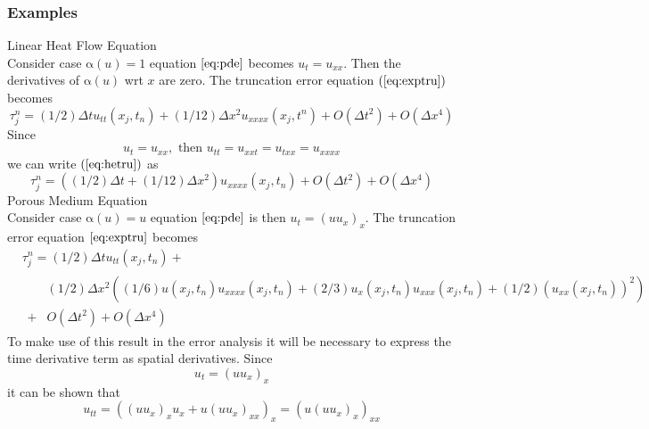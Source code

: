 \documentclass[11pt]{article}
\newcommand{\D}{\Delta}
\newcommand{\al}{\mathrm{\alpha}}
\begin{document}
\subsubsection{Examples}
Linear Heat Flow Equation\\
Consider case $\al(u)=1$ equation $\ref{eq:pde}$ becomes $u_t=u_{xx}$. Then the derivatives of $\al(u)$ wrt $x$ are zero. The truncation error equation $(\ref{eq:exptru})$ becomes
\begin{equation}
\label{eq:hetru}
\tau_j^n = (1/2)\D{t}u_{tt}(x_j,t_n) + (1/12) \D{x^2}u_{xxxx}(x_j,t^n) +O(\D{t^2})+ O(\D{x^4}) 
\end{equation}
Since $$u_t = u_{xx}, \text{ then }u_{tt} = u_{xxt} = u_{txx} = u_{xxxx}$$ 
we can write $(\ref{eq:hetru})$ as
\begin{equation}
\label{eq:hetru1}
\tau_j^n =\left ((1/2)\D{t} + (1/12) \D{x^2}\right)u_{xxxx}(x_j,t_n) +O(\D{t^2})+ O(\D{x^4}) 
\end{equation}
Porous Medium Equation\\
Consider case $\al(u)=u$ equation $\ref{eq:pde}$ is then $u_t=({uu_x})_x$. The truncation error equation $\ref{eq:exptru}$ becomes
\begin{equation}
\label{eq:pmetru}
\begin{split}
&\tau_j^n = (1/2)\D{t}u_{tt}(x_j,t_n) + \\
&\begin{aligned}
&(1/2) \D{x^2}\left(  (1/6)u(x_j,t_n)u_{xxxx}(x_j,t_n) + (2/3)u_x(x_j,t_n)u_{xxx}(x_j,t_n) + (1/2) (u_{xx}(x_j,t_n))^2  \right) \\
+&O(\D{t^2})+ O(\D{x^4})
\end{aligned}
\end{split}
\end{equation}
To make use of this result in the error analysis it will be necessary to express the time derivative term as spatial derivatives. 
Since $$u_t= (uu_x)_x$$ it can be shown that
$$u_{tt} = \left( (uu_x)_xu_x + u(uu_x)_{xx}  \right)_x  = \left(u(uu_x)_x     \right)_{xx}$$
%
%
%
\end{document}

